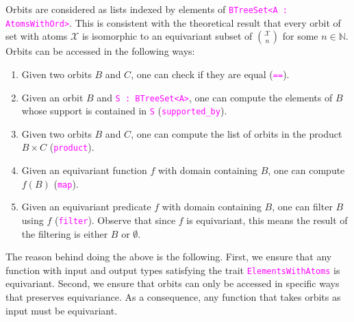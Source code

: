\documentclass[12pt,a4paper,article]{memoir}
\newcommand{\struct}{\mathcal{X}}
\newcommand{\N}{\mathbb{N}}
\newcommand{\code}[1]{\texttt{\textcolor{magenta}{#1}}}
\theoremstyle{definition}
\begin{document}
Orbits are considered as lists indexed by elements of
\code{BTreeSet<A : AtomsWithOrd>}.
This is consistent with the theoretical result that every orbit of set with atoms $\struct$ is isomorphic to an equivariant subset of $\binom{\struct}{n}$ for some $n\in\N$.
Orbits can be accessed in the following ways:
\begin{enumerate}
\item Given two orbits $B$ and $C$, one can check if they are equal (\code{==}).
\item Given an orbit $B$ and \code{S : BTreeSet<A>}, one can compute the elements of $B$ whose support is contained in \code{S} (\code{supported\_by}).
\item Given two orbits $B$ and $C$, one can compute the list of orbits in the product $B\times C$ (\code{product}).
\item Given an equivariant function $f$ with domain containing $B$,
one can compute $f(B)$ (\code{map}).
\item Given an equivariant predicate $f$ with domain containing $B$,
one can filter $B$ using $f$ (\code{filter}).
Observe that since $f$ is equivariant, this means the result of the filtering is either $B$ or $\emptyset$.
\end{enumerate}
The reason behind doing the above is the following.
First, we ensure that any function with input and output types satisfying the trait \code{ElementsWithAtoms} is equivariant.
Second, we ensure that orbits can only be accessed in specific ways that preserves equivariance.
As a consequence, any function that takes orbits as input must be equivariant.
\end{document}
